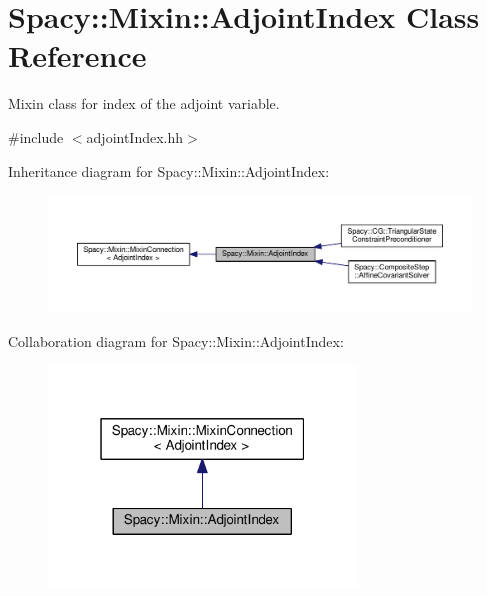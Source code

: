 \hypertarget{classSpacy_1_1Mixin_1_1AdjointIndex}{}\section{Spacy\+:\+:Mixin\+:\+:Adjoint\+Index Class Reference}
\label{classSpacy_1_1Mixin_1_1AdjointIndex}


Mixin class for index of the adjoint variable.  




{\ttfamily \#include $<$adjoint\+Index.\+hh$>$}



Inheritance diagram for Spacy\+:\+:Mixin\+:\+:Adjoint\+Index\+:\nopagebreak
\begin{figure}[H]
\begin{center}
\leavevmode
\includegraphics[width=350pt]{classSpacy_1_1Mixin_1_1AdjointIndex__inherit__graph}
\end{center}
\end{figure}


Collaboration diagram for Spacy\+:\+:Mixin\+:\+:Adjoint\+Index\+:\nopagebreak
\begin{figure}[H]
\begin{center}
\leavevmode
\includegraphics[width=232pt]{classSpacy_1_1Mixin_1_1AdjointIndex__coll__graph}
\end{center}
\end{figure}
